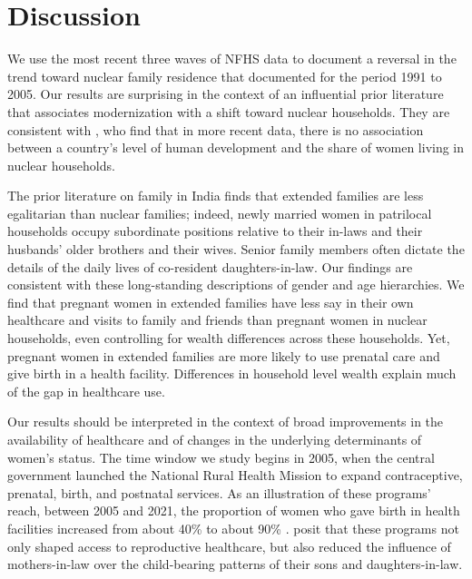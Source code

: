 \documentclass[10pt,twoside,reqno]{article}
\begin{document}
\section*{Discussion}

We use the most recent three waves of NFHS data to document a reversal in the trend toward nuclear family residence that \cite{allendorf2013going} documented for the period 1991 to 2005.  Our results are surprising in the context of an influential prior literature that associates modernization with a shift toward nuclear households.  They are consistent with \cite{pesando2018global}, who find that in more recent data, there is no association between a country's level of human development and the share of women living in nuclear households.

The prior literature on family in India finds that extended families are less egalitarian than nuclear families; indeed, newly married women in patrilocal households occupy subordinate positions relative to their in-laws and their husbands' older brothers and their wives. Senior family members often dictate the details of the daily lives of co-resident daughters-in-law. Our findings are consistent with these long-standing descriptions of gender and age hierarchies.  We find that pregnant women in extended families have less say in their own healthcare and visits to family and friends than pregnant women in nuclear households, even controlling for wealth differences across these households. Yet, pregnant women in extended families are more likely to use prenatal care and give birth in a health facility.  Differences in household level wealth explain much of the gap in healthcare use. 

Our results should be interpreted in the context of broad improvements in the availability of healthcare and of changes in the underlying determinants of women's status.  The time window we study begins in 2005, when the central government launched the National Rural Health Mission to expand contraceptive, prenatal, birth, and postnatal services.  As an illustration of these programs' reach, between 2005 and 2021, the proportion of women who gave birth in health facilities increased from about 40\% to about 90\% \citep{IIPS2007NFHS3,IIPS2021NFHS5}.  \cite{char2010influence} posit that these programs not only shaped access to reproductive healthcare, but also reduced the influence of mothers-in-law over the child-bearing patterns of their sons and daughters-in-law.  
\end{document}
